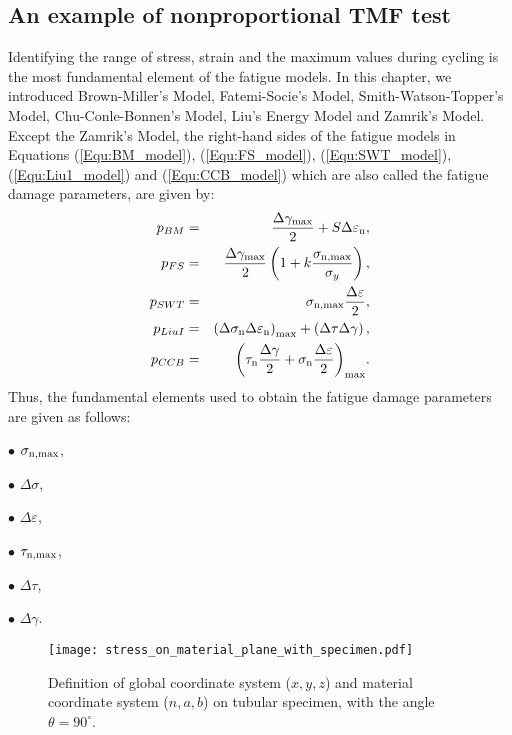 \subsection{An example of nonproportional TMF test}
\noindent
Identifying the range of stress, strain and the maximum values during cycling is the most fundamental element of the fatigue models.
In this chapter, we introduced Brown-Miller's Model, Fatemi-Socie's Model, Smith-Watson-Topper's Model, Chu-Conle-Bonnen's Model, Liu's Energy Model and Zamrik's Model.
Except the Zamrik's Model, the right-hand sides of the fatigue models in Equations (\ref{Equ:BM_model}), (\ref{Equ:FS_model}), (\ref{Equ:SWT_model}), (\ref{Equ:Liu1_model}) and (\ref{Equ:CCB_model}) which are also called the fatigue damage parameters, are given by:
\begin{eqnarray*}
p_{BM}&=&\frac{{\Delta {\gamma _{\max}}}}{2} + S\Delta {\varepsilon _{\rm n}}, \\
p_{FS}&=&\frac{{\Delta {\gamma _{\max }}}}{2}\left( {1 + k\frac{{{\sigma _{\rm n,\max}}}}{{{\sigma _y}}}} \right), \\
p_{SWT}&=&{\sigma _{\rm n, \max}}\frac{{\Delta \varepsilon }}{2}, \\
p_{LiuI}&=&{\left( {\Delta {\sigma _{\rm n}}\Delta {\varepsilon _{\rm n}}} \right)_{\max }} + \left( {\Delta \tau \Delta \gamma } \right), \\
p_{CCB}&=&{\left( {{\tau _{\rm n}}\frac{{\Delta \gamma }}{2} + {\sigma _{\rm n }}\frac{{\Delta \varepsilon }}{2}} \right)_{\max }}. 
\end{eqnarray*}
Thus, the fundamental elements used to obtain the fatigue damage parameters are given as follows:

$\bullet$ $\sigma_{\rm{n,max}}$,

$\bullet$ $\Delta \sigma$,

$\bullet$ $\Delta \varepsilon$,

$\bullet$ $\tau_{\rm{n,max}}$,

$\bullet$ $\Delta \tau$,

$\bullet$ $\Delta \gamma$.

\begin{figure}
\centering
\texttt{[image: stress\_on\_material\_plane\_with\_specimen.pdf]}
\caption{Definition of global coordinate system ($x,y,z$) and material coordinate system ($n,a,b$) on tubular specimen, with the angle $\theta=90^\circ$.}
\label{Fig:stress_on_material_plane_with_specimen}
\end{figure}

